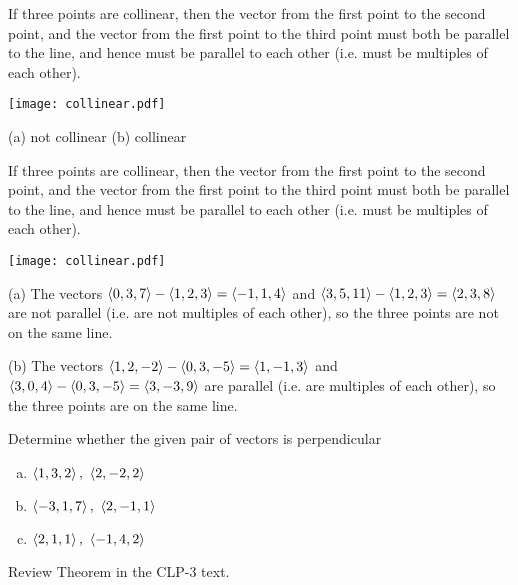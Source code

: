 \begin{hint}
If three points are collinear, then the vector from the first point
to the second point, and the vector from the first point to the third point 
must both be parallel to the line, and hence must be parallel to each other
(i.e. must be multiples of each other).

\begin{center}
     \texttt{[image: collinear.pdf]}
\end{center}

\end{hint}

\begin{answer}
(a) not collinear\qquad
(b) collinear
\end{answer}

\begin{solution}
If three points are collinear, then the vector from the first point
to the second point, and the vector from the first point to the third point 
must both be parallel to the line, and hence must be parallel to each other
(i.e. must be multiples of each other).

\begin{center}
     \texttt{[image: collinear.pdf]}
\end{center}

(a)
The vectors $\left< 0,3,7\right> -\left< 1,2,3\right> =\left< -1,1,4\right> $ and $\left< 3,5,11\right> -\left< 1,2,3\right> =\left< 2,3,8\right> $ 
are not parallel (i.e. are not multiples of each other),
so the three points are not on the same line.

(b)
The vectors $\left< 1,2,-2\right> -\left< 0,3,-5\right> =\left< 1,-1,3\right> $ and
$\left< 3,0,4\right> -\left< 0,3,-5\right> =\left< 3,-3,9\right> $ are parallel (i.e. are  multiples of each other),
so the three points are on the same line.
\end{solution}

\begin{question}
Determine whether the given pair of vectors is perpendicular
\begin{enumerate}[(a)]
\item
$\left< 1,3,2\right> ,\ \left< 2,-2,2\right> $ 
\item
$\left< -3,1,7\right> ,\ \left< 2,-1,1\right> $ 
\item
$\left< 2,1,1\right> ,\ \left< -1,4,2\right> $ 
\end{enumerate}
\end{question}

\begin{hint}
Review Theorem  in the CLP-3 text.
\end{hint}


